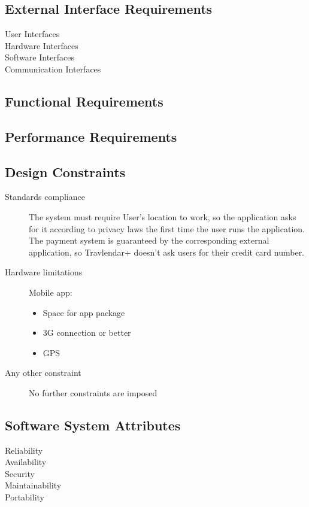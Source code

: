 \subsection{External Interface Requirements}
				\begin{description}
					\item[User Interfaces]
					\item[Hardware Interfaces]
					\item[Software Interfaces]
					\item[Communication Interfaces]
				\end{description}

\subsection{Functional Requirements}
	
			
\subsection{Performance Requirements}
		
		
\subsection{Design Constraints}
		\begin{description}
			\item[Standards compliance]
			The system must require User’s location to work, so the application asks for it according to privacy laws the first time the user runs the application.
			The payment system is guaranteed by the corresponding external application, so Travlendar+ doesn’t ask users for their credit card number.

			\item[Hardware limitations]
			Mobile app:
			\begin{itemize}
			\item Space for app package
			\item 3G connection or better
			\item GPS
		\end{itemize}

			\item[Any other constraint]
			No further constraints are imposed
\end{description}
		
\subsection{Software System Attributes}
	\begin{description}
		\item[Reliability]
		\item[Availability]
		\item[Security]
		\item[Maintainability]
		\item[Portability]
\end{description}

